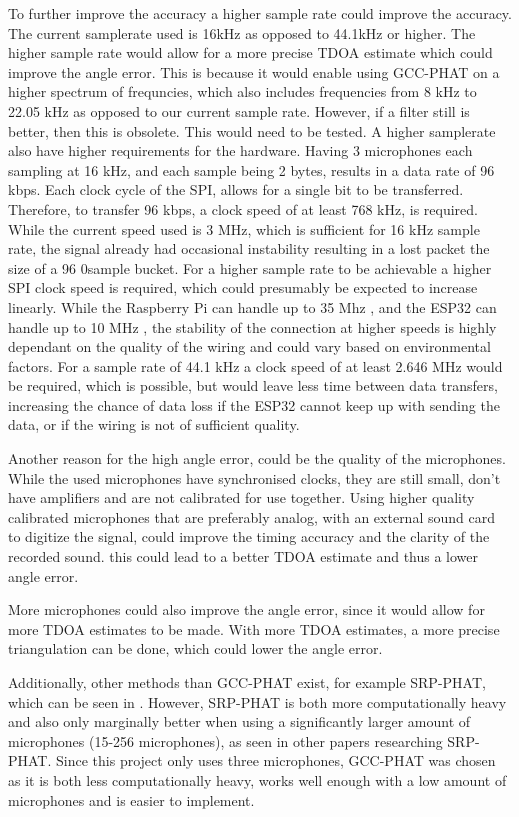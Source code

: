 To further improve the accuracy a higher sample rate could improve the accuracy. The current samplerate used is 16kHz as opposed to 44.1kHz or higher. The higher sample rate would allow for a more precise TDOA estimate which could improve the angle error. This is because it would enable using GCC-PHAT on a higher spectrum of frequncies, which also includes frequencies from 8 kHz to 22.05 kHz as opposed to our current sample rate. However, if a filter still is better, then this is obsolete. This would need to be tested. A higher samplerate also have higher requirements for the hardware. Having 3 microphones each sampling at 16 kHz, and each sample being 2 bytes, results in a data rate of 96 kbps. Each clock cycle of the SPI, allows for a single bit to be transferred. Therefore, to transfer 96 kbps, a clock speed of at least 768 kHz, is required. While the current speed used is 3 MHz, which is sufficient for 16 kHz sample rate, the signal already had occasional instability resulting in a lost packet the size of a 96 0sample bucket. For a higher sample rate to be achievable a higher SPI clock speed is required, which could presumably be expected to increase linearly. While the Raspberry Pi can handle up to 35 Mhz \cite{BCM2711_Peripherals}, and the ESP32 can handle up to 10 MHz \cite{ESP32_SPI_Slave}, the stability of the connection at higher speeds is highly dependant on the quality of the wiring and could vary based on environmental factors. For a sample rate of 44.1 kHz a clock speed of at least 2.646 MHz would be required, which is possible, but would leave less time between data transfers, increasing the chance of data loss if the ESP32 cannot keep up with sending the data, or if the wiring is not of sufficient quality.

Another reason for the high angle error, could be the quality of the microphones. While the used microphones have synchronised clocks, they are still small, don't have amplifiers and are not calibrated for use together. Using higher quality calibrated microphones that are preferably analog, with an external sound card to digitize the signal, could improve the timing accuracy and the clarity of the recorded sound. this could lead to a better TDOA estimate and thus a lower angle error.

More microphones could also improve the angle error, since it would allow for more TDOA estimates to be made. With more TDOA estimates, a more precise triangulation can be done, which could lower the angle error.

Additionally, other methods than GCC-PHAT exist, for example SRP-PHAT, which can be seen in \cite{SRP-PHAT}. However, SRP-PHAT is both more computationally heavy and also only marginally better when using a significantly larger amount of microphones (15-256 microphones), as seen in other papers researching SRP-PHAT. Since this project only uses three microphones, GCC-PHAT was chosen as it is both less computationally heavy, works well enough with a low amount of microphones and is easier to implement.

